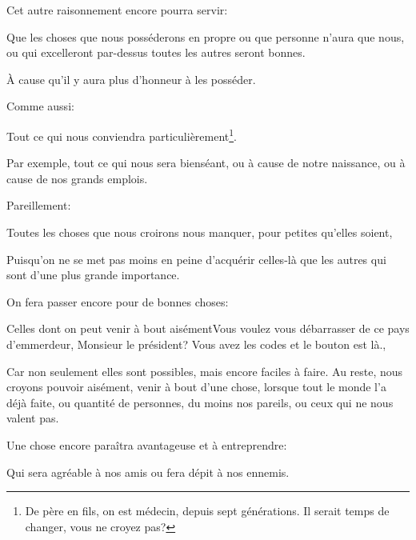 \bigbreak

Cet autre raisonnement encore pourra servir:

\begin{emphpar}
	  Que les choses que nous posséderons en propre ou que personne n'aura que nous, ou qui excelleront par-dessus toutes les autres
	  seront bonnes.
\end{emphpar}

À cause qu'il y aura plus d'honneur à les posséder.

\bigbreak

Comme aussi:

\begin{emphpar}
	  Tout ce qui nous conviendra particulièrement\footnote{De père en fils, on est médecin, depuis sept générations. Il serait temps
	  de changer, vous ne croyez pas?}.
\end{emphpar}

Par exemple, tout ce qui nous sera bienséant, ou à cause de notre naissance, ou à cause de nos grands emplois.

\bigbreak

Pareillement:

\begin{emphpar}
	  Toutes les choses que nous croirons nous manquer, pour petites qu'elles soient,
\end{emphpar}

Puisqu'on ne se met pas moins en peine d'acquérir celles-là que les autres qui sont d'une plus grande importance.

\bigbreak

On fera passer encore pour de bonnes choses:

\begin{emphpar}
    Celles dont on peut venir à bout aisément{Vous voulez vous débarrasser de ce pays d'emmerdeur, Monsieur le
	président? Vous avez les codes et le bouton est là.},
\end{emphpar}

Car non seulement elles sont possibles, mais encore faciles à faire. Au reste, nous croyons pouvoir aisément, venir à
bout d'une chose, lorsque tout le monde l'a déjà faite, ou quantité de personnes, du moins nos pareils, ou ceux qui ne
nous valent pas.

\bigbreak

Une chose encore paraîtra avantageuse et à entreprendre:

\begin{emphpar}
	  Qui sera agréable à nos amis ou fera dépit à nos ennemis.
\end{emphpar}

